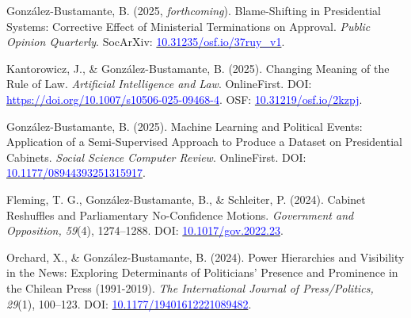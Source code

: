 \begin{publications}

\begin{benumerate}{14}

\item{González-Bustamante, B. (2025, {\itshape forthcoming}). Blame-Shifting in Presidential Systems: Corrective Effect of Ministerial Terminations on Approval. {\itshape Public Opinion Quarterly}. SocArXiv: \href{https://doi.org/10.31235/osf.io/37ruy_v1}{\textcolor{blue}{10.31235/osf.io/37ruy\_v1}}.}\vspace{1mm}

\item{Kantorowicz, J., \& González-Bustamante, B. (2025). Changing Meaning of the Rule of Law. {\itshape Artificial Intelligence and Law}. OnlineFirst. DOI: \href{https://doi.org/10.1007/s10506-025-09468-4}{\textcolor{blue}{https://doi.org/10.1007/s10506-025-09468-4}}. OSF: \href{https://doi.org/10.31219/osf.io/2kzpj}{\textcolor{blue}{10.31219/osf.io/2kzpj}}.}\vspace{1mm}

\item{González-Bustamante, B. (2025). Machine Learning and Political Events: Application of a Semi-Supervised Approach to Produce a Dataset on Presidential Cabinets. {\itshape Social Science Computer Review}. OnlineFirst. DOI: \href{https://doi.org/10.1177/08944393251315917}{\textcolor{blue}{10.1177/08944393251315917}}.}\vspace{1mm} %

\item{Fleming, T. G., González-Bustamante, B., \& Schleiter, P. (2024). Cabinet Reshuffles and Parliamentary No-Confidence Motions. {\itshape Government and Opposition, 59}(4), 1274--1288. DOI: \href{https://doi.org/10.1017/gov.2022.23}{\textcolor{blue}{10.1017/gov.2022.23}}.}\vspace{1mm}

\item{Orchard, X., \& González-Bustamante, B. (2024). Power Hierarchies and Visibility in the News: Exploring Determinants of Politicians’ Presence and Prominence in the Chilean Press (1991-2019). {\itshape The International Journal of Press/Politics, 29}(1), 100--123. DOI: \href{https://doi.org/10.1177/19401612221089482}{\textcolor{blue}{10.1177/19401612221089482}}.}\vspace{1mm}


\end{benumerate}
\end{publications}
